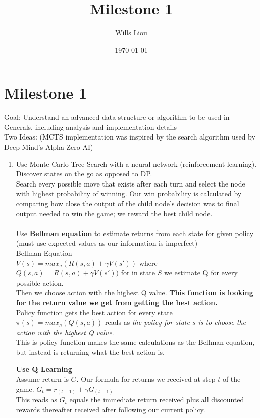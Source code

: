 \documentclass{article}
\title{Milestone 1}
\author{Wills Liou}
\date{\today}
\begin{document}
\maketitle


\section{Milestone 1} 
Goal: Understand an advanced data structure or algorithm to be used in Generals, including analysis and implementation details \\

Two Ideas: (MCTS implementation was inspired by the search algorithm used by Deep Mind's Alpha Zero AI) \\ 
\begin{enumerate}
\item Use Monte Carlo Tree Search with a neural network (reinforcement learning). Discover states on the go as opposed to DP. \\
Search every possible move that exists after each turn and select the node with highest probability of winning. Our win probability is calculated by comparing how close the output of the child node's decision was to final output needed to win the game; we reward the best child node. \\ \\
Use \textbf{Bellman equation} to estimate returns from each state for given policy (must use expected values as our information is imperfect) \\
Bellman Equation \\
$V(s) = max_a(R(s,a) + \gamma V(s'))$ where $Q(s,a) = R(s,a) + \gamma V(s'))$ for in state $S$ we estimate Q for every possible action. \\ 
Then we choose action with the highest Q value. \textbf{This function is looking for the return value we get from getting the best action.} \\

Policy function gets the best action for every state \\ 
$\pi(s) = max_a(Q(s,a))$ reads as \textit{the policy for state $s$ is to choose the action with the highest Q value}. \\ This is policy function makes the same calculations as the Bellman equation, but instead is returning what the best action is.

\textbf{Use Q Learning} \\
Assume return is $G$. 
Our formula for returns we received at step $t$ of the game. $G_t = r_{(t+1)} + \gamma G_{(t+1)}$ \\
This reads as $G_t$ equals the immediate return received plus all discounted rewards thereafter received after following our current policy.


\end{enumerate}
\end{document}
